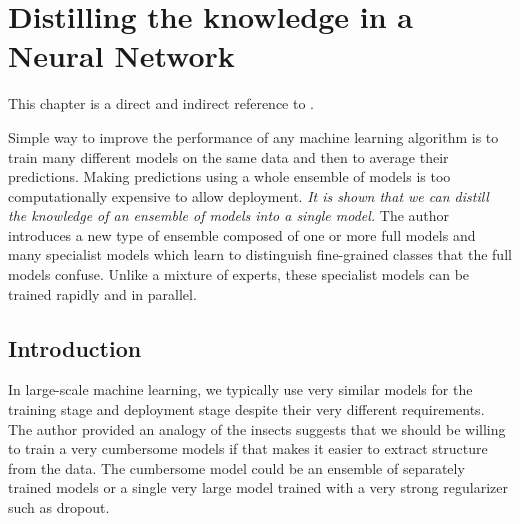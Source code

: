 \chapter{Distilling the knowledge in a Neural Network}
This chapter is a direct and indirect reference to \cite{hinton2015distilling}.

Simple way to improve the performance of any machine learning algorithm is to train many different models on the same data and then to average their predictions. Making predictions using a whole ensemble of models is too computationally expensive to allow deployment. \textit{It is shown that we can distill the knowledge of an ensemble of models into a single model.} The author introduces a new type of ensemble composed of one or more full models and many specialist models which learn to distinguish fine-grained classes that the full models confuse. Unlike a mixture of experts, these specialist models can be trained rapidly and in parallel. 

\section{Introduction}

In large-scale machine learning, we typically use very similar models for the training stage and deployment stage despite their very different requirements. The author provided an analogy of the insects suggests that we should be willing to train a very cumbersome models if that makes it easier to extract structure from the data. The cumbersome model could be an ensemble of separately trained models or a single very large model trained with a very strong regularizer such as dropout. 
